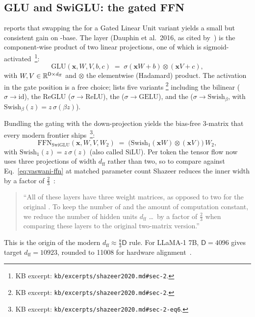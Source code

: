 \subsection{GLU and SwiGLU: the gated FFN}
\label{sec:ffn-swiglu}

\citet{shazeer2020} reports that swapping the  for a Gated Linear
Unit variant yields a small but consistent  gain on
-base. The  layer (Dauphin et al.\ 2016, as cited
by~\citealp[\S 2]{shazeer2020}) is the
component-wise product of two linear projections, one of which is
sigmoid-activated~\citep[\S 2, Eq.~4]{shazeer2020}\footnote{KB
excerpt: \texttt{kb/excerpts/shazeer2020.md\#sec-2}.}:
\begin{equation}
  \mathrm{GLU}(\mathbf{x}, W, V, b, c)
  \;=\; \sigma(\mathbf{x} W + b) \otimes (\mathbf{x} V + c),
  \tag{Shazeer--Eq.~4}
  \label{eq:glu}
\end{equation}
with $W, V \in \mathbb{R}^{\mathsf{D} \times d_{\text{ff}}}$ and $\otimes$
the elementwise (Hadamard) product. The activation in the gate
position is a free choice; \citet[\S 2, Eq.~5]{shazeer2020} lists
five variants%
\footnote{KB excerpt: \texttt{kb/excerpts/shazeer2020.md\#sec-2}.}
including the bilinear ($\sigma \to \mathrm{id}$), the ReGLU
($\sigma \to \mathrm{ReLU}$), the  ($\sigma \to \mathrm{GELU}$),
and the  ($\sigma \to \mathrm{Swish}_\beta$, with
$\mathrm{Swish}_\beta(z) = z\,\sigma(\beta z)$).

Bundling the gating with the down-projection yields the bias-free
3-matrix  that every modern frontier 
ships~\citep[\S 2, Eq.~6]{shazeer2020}\footnote{KB excerpt:
\texttt{kb/excerpts/shazeer2020.md\#sec-2-eq6}.}:
\begin{equation}
  \mathrm{FFN}_{\mathrm{SwiGLU}}(\mathbf{x}, W, V, W_2)
  \;=\; \bigl(\mathrm{Swish}_1(\mathbf{x} W) \otimes (\mathbf{x} V)\bigr)\, W_2,
  \tag{Shazeer--Eq.~6}
  \label{eq:swiglu}
\end{equation}
with $\mathrm{Swish}_1(z) = z\,\sigma(z)$ (also called SiLU). Per token
the tensor flow now uses three projections of width $d_{\text{ff}}$
rather than two, so to compare against
Eq.~\eqref{eq:vaswani-ffn} at matched parameter count Shazeer reduces
the inner width by a factor of $\tfrac{2}{3}$~\citep[\S 2]{shazeer2020}:
\begin{quote}
``All of these layers have three weight matrices, as opposed to two
for the original . To keep the number of  and the amount
of computation constant, we reduce the number of hidden units
$d_{\text{ff}}$ \dots\ by a factor of $\tfrac{2}{3}$ when comparing
these layers to the original two-matrix
version.''~\citep[\S 2]{shazeer2020}
\end{quote}
This is the origin of the modern $d_{\text{ff}} \approx
\tfrac{8}{3}\mathsf{D}$ rule. For LLaMA-1 7B, $\mathsf{D} = 4096$ gives
target $d_{\text{ff}} = 10923$, rounded to 11008 for hardware
alignment~\citep{touvron2023}.

